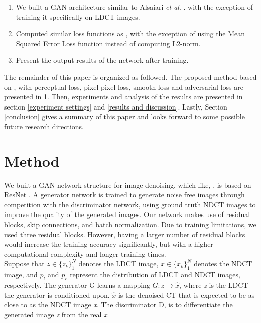 \documentclass[journal]{IEEEtran}
\begin{document}
	\begin{enumerate}
		\item We built a GAN architecture similar to Alsaiari \emph{et al}. \cite{alsaiari2019image}. with the exception of training it specifically on LDCT images.
		\item Computed similar loss functions as \cite{alsaiari2019image}, with the exception of using the Mean Squared Error Loss function instead of computing L2-norm.
		\item Present the output results of the network after training.
	\end{enumerate}
	
 The remainder of this paper is organized as followed.  The proposed method based on \cite{alsaiari2019image}, with perceptual loss, pixel-pixel loss, smooth loss and adversarial loss are presented in \ref{method}.  Then, experiments and analysis of the results are presented in section \ref{experiment settings} and \ref{results and discussion}.  Lastly, Section \ref{conclusion} gives a summary of this paper and looks forward to some possible future research directions.

\section{Method}
\label{method}
	We built a GAN network structure for image denoising, which like, \cite{alsaiari2019image}, is based on ResNet \cite{he2016deep}.  A generator network is trained to generate noise free images through competition with the discriminator network, using ground truth NDCT images to improve the quality of the generated images.  Our network makes use of residual blocks, skip connections, and batch normalization.  Due to training limitations, we used three residual blocks.  However, having a larger number of residual blocks would increase the training accuracy significantly, but with a higher computational complexity and longer training times.\\
	Suppose that $z \in \{z_k\}_1^N$ denotes the LDCT image, $x \in \{x_k\}_1^N$ denotes the NDCT image, and $p_l$ and $p_r$ represent the distribution of LDCT and NDCT images, respectively.  The generator G learns a mapping $G: z \rightarrow \hat{x}$, where \emph{z} is the LDCT the generator is conditioned upon.  $\hat{x}$ is the denoised CT that is expected to be as close to as the NDCT image \emph{x}.  The discriminator D, is to differentiate the generated image \emph{z} from the real \emph{x}.  
	
\end{document}
